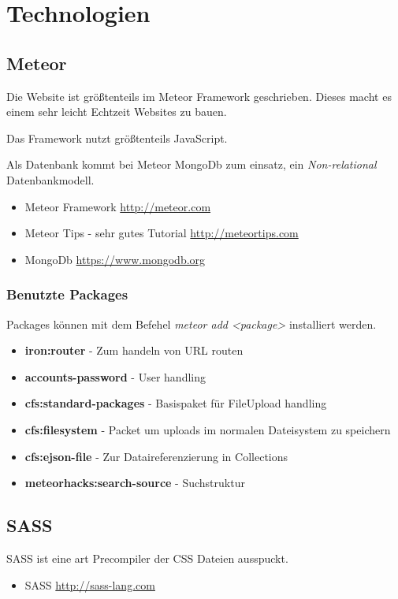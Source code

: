 \documentclass[Info_VK_Website_Dokumentation.tex]{subfiles}
\begin{document}
	
\chapter{Technologien}

\section{Meteor} 

Die Website ist größtenteils im Meteor Framework geschrieben. Dieses macht es einem sehr leicht Echtzeit Websites zu bauen.

Das Framework nutzt größtenteils JavaScript.

Als Datenbank kommt bei Meteor MongoDb zum einsatz, ein \emph{Non-relational} Datenbankmodell.

\begin{itemize}
 	\item Meteor Framework \url{http://meteor.com} \\
 	\item Meteor Tips - sehr gutes Tutorial \url{http://meteortips.com} \\
 	\item MongoDb \url{https://www.mongodb.org} \\ 
\end{itemize} 

\subsection{Benutzte Packages}

Packages können mit dem Befehel \emph{meteor add <package>} installiert werden.

\begin{itemize}
 	\item \textbf{iron:router} - Zum handeln von URL routen \\
 	\item \textbf{accounts-password} - User handling \\
 	\item \textbf{cfs:standard-packages} - Basispaket für FileUpload handling \\
 	\item \textbf{cfs:filesystem} - Packet um uploads im normalen Dateisystem zu speichern \\
 	\item \textbf{cfs:ejson-file} - Zur Dataireferenzierung in Collections \\
 	\item \textbf{meteorhacks:search-source} - Suchstruktur \\
 \end{itemize} 

\section{SASS}

SASS ist eine art Precompiler der CSS Dateien ausspuckt.

\begin{itemize}
	\item SASS \url{http://sass-lang.com} 
\end{itemize}
\end{document}
